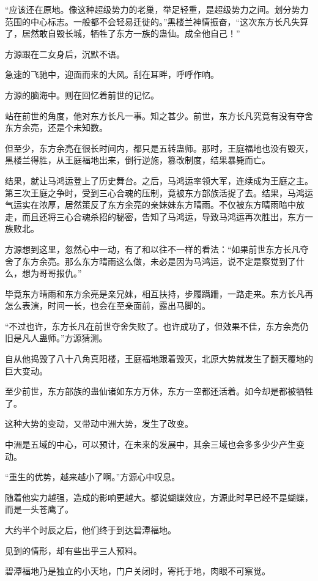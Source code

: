 \begin{this_body}
“应该还在原地。像这种超级势力的老巢，举足轻重，是超级势力之间。划分势力范围的中心标志。一般都不会轻易迁徙的。”黑楼兰神情振奋，“这次东方长凡失算了，居然敢自毁长城，牺牲了东方一族的蛊仙。成全他自己！”

方源跟在二女身后，沉默不语。

急速的飞驰中，迎面而来的大风。刮在耳畔，呼呼作响。

方源的脑海中。则在回忆着前世的记忆。

站在前世的角度，他对东方长凡一事。知之甚少。前世，东方长凡究竟有没有夺舍东方余亮，还是个未知数。

但至少，东方余亮在很长时间内，都只是五转蛊师。那时，王庭福地也没有毁灭，黑楼兰得胜，从王庭福地出来，倒行逆施，篡改制度，结果暴毙而亡。

结果，就让马鸿运登上了历史舞台。之后，马鸿运率领大军，连续成为王庭之主。第三次王庭之争时，受到三心合魂的压制，竟被东方部族活捉了去。结果，马鸿运气运实在浓厚，居然策反了东方余亮的亲妹妹东方晴雨。不仅被东方晴雨暗中放走，而且还将三心合魂杀招的秘密，告知了马鸿运，导致马鸿运再次胜出，东方一族败北。

方源想到这里，忽然心中一动，有了和以往不一样的看法：“如果前世东方长凡夺舍了东方余亮。那么东方晴雨这么做，未必是因为马鸿运，说不定是察觉到了什么，想为哥哥报仇。”

毕竟东方晴雨和东方余亮是亲兄妹，相互扶持，步履蹒跚，一路走来。东方长凡再怎么表演，时间一长，也会在至亲面前，露出马脚的。

“不过也许，东方长凡在前世夺舍失败了。也许成功了，但效果不佳，东方余亮仍旧是凡人蛊师。”方源猜测。

自从他捣毁了八十八角真阳楼，王庭福地跟着毁灭，北原大势就发生了翻天覆地的巨大变动。

至少前世，东方部族的蛊仙诸如东方万休，东方一空都还活着。如今却是都被牺牲了。

这种大势的变动，又带动中洲大势，发生了改变。

中洲是五域的中心，可以预计，在未来的发展中，其余三域也会多多少少产生变动。

“重生的优势，越来越小了啊。”方源心中叹息。

随着他实力越强，造成的影响更越大。都说蝴蝶效应，方源此时早已经不是蝴蝶，而是一头苍鹰了。

大约半个时辰之后，他们终于到达碧潭福地。

见到的情形，却有些出乎三人预料。

碧潭福地乃是独立的小天地，门户关闭时，寄托于地，肉眼不可察觉。


\end{this_body}
